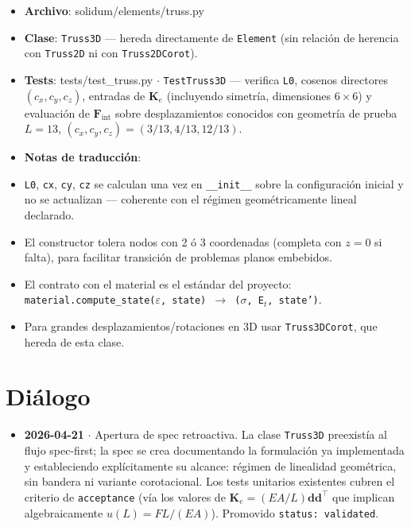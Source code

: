 \documentclass[11pt,letterpaper,oneside]{report}
\begin{document}
\begin{itemize}
  \item \textbf{Archivo}: solidum/elements/truss.py
  \item \textbf{Clase}: \texttt{Truss3D} --- hereda directamente de \texttt{Element} (sin relación de herencia con \texttt{Truss2D} ni con \texttt{Truss2DCorot}).
  \item \textbf{Tests}: tests/test\_truss.py \ensuremath{\cdot} \texttt{TestTruss3D} --- verifica \texttt{L0}, cosenos directores $(c_x, c_y, c_z)$, entradas de $\mathbf K_e$ (incluyendo simetría, dimensiones $6\times 6$) y evaluación de $\mathbf F_{\text{int}}$ sobre desplazamientos conocidos con geometría de prueba $L=13$, $(c_x,c_y,c_z)=(3/13, 4/13, 12/13)$.
  \item \textbf{Notas de traducción}:
  \item \texttt{L0}, \texttt{cx}, \texttt{cy}, \texttt{cz} se calculan una vez en \texttt{\_\_init\_\_} sobre la configuración inicial y no se actualizan --- coherente con el régimen geométricamente lineal declarado.
  \item El constructor tolera nodos con 2 ó 3 coordenadas (completa con $z=0$ si falta), para facilitar transición de problemas planos embebidos.
  \item El contrato con el material es el estándar del proyecto: \texttt{material.compute\_state(\ensuremath{\varepsilon}, state) \ensuremath{\to} (\ensuremath{\sigma}, E\ensuremath{_{t}}, state')}.
  \item Para grandes desplazamientos/rotaciones en 3D usar \texttt{Truss3DCorot}, que hereda de esta clase.
\end{itemize}


\section{Diálogo}

\begin{itemize}
  \item \textbf{2026-04-21} \ensuremath{\cdot} Apertura de spec retroactiva. La clase \texttt{Truss3D} preexistía al flujo spec-first; la spec se crea documentando la formulación ya implementada y estableciendo explícitamente su alcance: régimen de linealidad geométrica, sin bandera ni variante corotacional. Los tests unitarios existentes cubren el criterio de \texttt{acceptance} (vía los valores de $\mathbf K_e = (EA/L)\mathbf d\mathbf d^\top$ que implican algebraicamente $u(L)=FL/(EA)$). Promovido \texttt{status: validated}.
\end{itemize}
\end{document}
